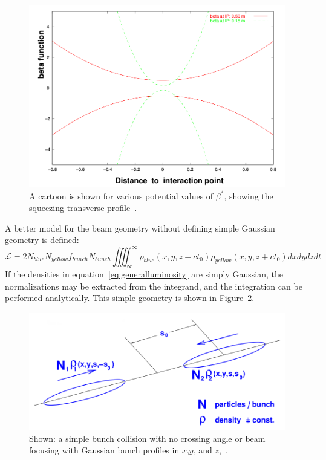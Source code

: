 \begin{figure}[h]
  \centering
  \includegraphics[width=0.8\linewidth]{./figures/beta_function.png}
  \caption{
    A cartoon is shown for various potential values of $\beta^*$, showing the
    squeezing transverse profile~\cite{Herr2003a}.
  }
  \label{fig:beta_squeeze}

\end{figure}

A better model for the beam geometry without defining simple Gaussian geometry
is defined:
\begin{equation}
\label{eq:generalluminosity}
\mathcal{L} = 2N_{blue}N_{yellow}f_{bunch}N_{bunch}\iiiint _{\infty}^{ \infty}{
\rho_{blue} (x,y,z-ct_0)\rho_{yellow} (x,y,z+ct_0)} dxdydzdt
\end{equation}
If the densities in equation~\ref{eq:generalluminosity} are simply Gaussian,
the normalizations may be extracted from the integrand, and the integration can
be performed analytically. This simple geometry is shown in
Figure~\ref{fig:simple_bunch_xing}.

\begin{figure}
  \centering
  \includegraphics[width=0.75\linewidth]{./figures/simple_bunch_head_on.png}
  \caption{
    Shown: a simple bunch collision with no crossing angle or beam focusing with
    Gaussian bunch profiles in $x$,$y$, and $z$,~\cite{Herr2003a}.
  }
  \label{fig:simple_bunch_xing}
\end{figure}

